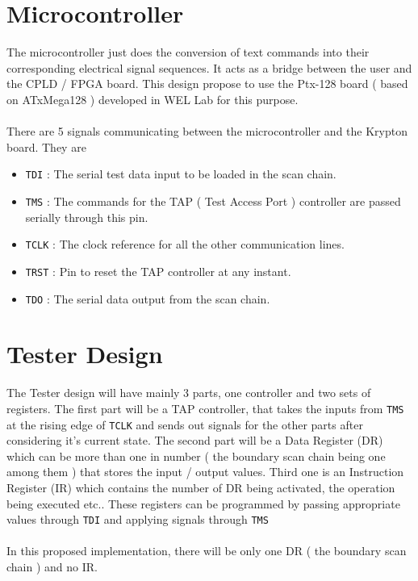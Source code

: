 \documentclass{article}
\begin{document}
\section{Microcontroller}
The microcontroller just does the conversion of text commands into their corresponding electrical signal sequences. It acts as a bridge between the user and the CPLD / FPGA board. This design propose to use the Ptx-128 board ( based on ATxMega128 ) developed in WEL Lab for this purpose.
\paragraph*{}
There are 5 signals communicating between the microcontroller and the Krypton board. They are
\begin{itemize}
 \item \texttt{TDI} : The serial test data input to be loaded in the scan chain.
 \item \texttt{TMS} : The commands for the TAP ( Test Access Port ) controller are passed serially through this pin.
 \item \texttt{TCLK} : The clock reference for all the other communication lines.
 \item \texttt{TRST} : Pin to reset the TAP controller at any instant.
 \item \texttt{TDO} : The serial data output from the scan chain.
\end{itemize}



\section{Tester Design}
The Tester design will have mainly 3 parts, one controller and two sets of registers. The first part will be a TAP controller, that takes the inputs from \texttt{TMS} at the rising edge of \texttt{TCLK} and sends out signals for the other parts after considering it's current state. The second part will be a Data Register (DR) which can be more than one in number ( the boundary scan chain being one among them ) that stores the input / output values. Third one is an Instruction Register (IR) which contains the number of DR being activated, the operation being executed etc.. These registers can be programmed by passing appropriate values through \texttt{TDI} and applying signals through \texttt{TMS}
\paragraph*{}
In this proposed implementation, there will be only one DR ( the boundary scan chain ) and no IR.
\end{document}
